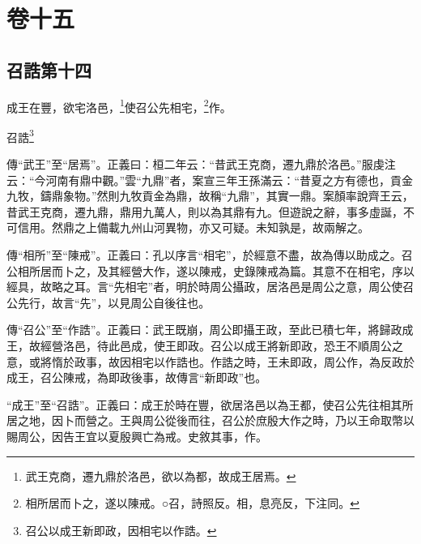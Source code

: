 

\chapter{卷十五}


\section{召誥第十四}


成王在豐，欲宅洛邑，\footnote{武王克商，遷九鼎於洛邑，欲以為都，故成王居焉。}使召公先相宅，\footnote{相所居而卜之，遂以陳戒。○召，詩照反。相，息亮反，下注同。}作。

召誥\footnote{召公以成王新即政，因相宅以作誥。}


{\noindent\zhuan{}\fzbyks 傳“武王”至“居焉”。正義曰：桓二年云：“昔武王克商，遷九鼎於洛邑。”服虔注云：“今河南有鼎中觀。”雲“九鼎”者，案宣三年王孫滿云：“昔夏之方有德也，貢金九牧，鑄鼎象物。”然則九牧貢金為鼎，故稱“九鼎”，其實一鼎。案顏率說齊王云，昔武王克商，遷九鼎，鼎用九萬人，則以為其鼎有九。但遊說之辭，事多虛誕，不可信用。然鼎之上備載九州山河異物，亦又可疑。未知孰是，故兩解之。 \par}

{\noindent\zhuan{}\fzbyks 傳“相所”至“陳戒”。正義曰：孔以序言“相宅”，於經意不盡，故為傳以助成之。召公相所居而卜之，及其經營大作，遂以陳戒，史錄陳戒為篇。其意不在相宅，序以經具，故略之耳。言“先相宅”者，明於時周公攝政，居洛邑是周公之意，周公使召公先行，故言“先”，以見周公自後往也。 \par}

{\noindent\zhuan{}\fzbyks 傳“召公”至“作誥”。正義曰：武王既崩，周公即攝王政，至此已積七年，將歸政成王，故經營洛邑，待此邑成，使王即政。召公以成王將新即政，恐王不順周公之意，或將惰於政事，故因相宅以作誥也。作誥之時，王未即政，周公作，為反政於成王，召公陳戒，為即政後事，故傳言“新即政”也。 \par}

{\noindent\shu{}\fzkt “成王”至“召誥”。正義曰：成王於時在豐，欲居洛邑以為王都，使召公先往相其所居之地，因卜而營之。王與周公從後而往，召公於庶殷大作之時，乃以王命取幣以賜周公，因告王宜以夏殷興亡為戒。史敘其事，作。 \par}

